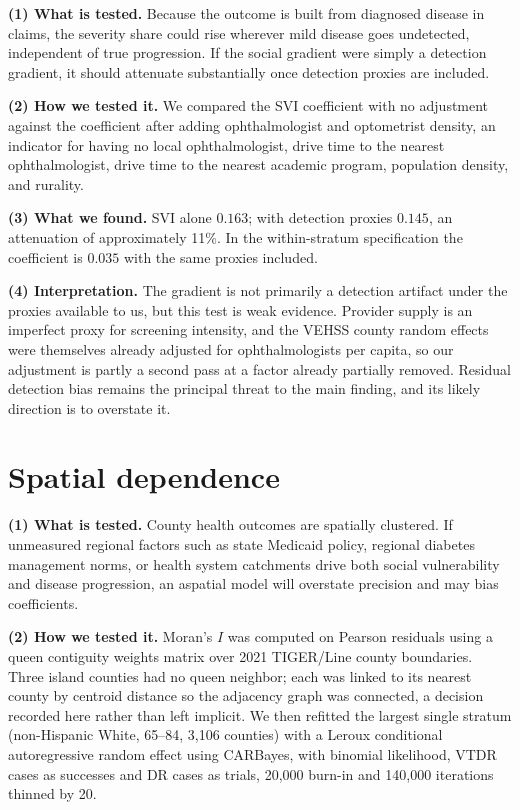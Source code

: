 \documentclass[11pt]{article}
\newcommand{\tpart}[1]{\medskip\noindent\textbf{#1}\quad}
\begin{document}
\tpart{(1) What is tested.}
Because the outcome is built from diagnosed disease in claims, the severity
share could rise wherever mild disease goes undetected, independent of true
progression. If the social gradient were simply a detection gradient, it should
attenuate substantially once detection proxies are included.

\tpart{(2) How we tested it.}
We compared the SVI coefficient with no adjustment against the coefficient after
adding ophthalmologist and optometrist density, an indicator for having no local
ophthalmologist, drive time to the nearest ophthalmologist, drive time to the
nearest academic program, population density, and rurality.

\tpart{(3) What we found.}
SVI alone $0.163$; with detection proxies $0.145$, an attenuation of
approximately 11\%. In the within-stratum specification the coefficient is
$0.035$ with the same proxies included.

\tpart{(4) Interpretation.}
The gradient is not primarily a detection artifact under the proxies available
to us, but this test is weak evidence. Provider supply is an imperfect proxy for
screening intensity, and the VEHSS county random effects were themselves already
adjusted for ophthalmologists per capita, so our adjustment is partly a second
pass at a factor already partially removed. Residual detection bias remains the
principal threat to the main finding, and its likely direction is to overstate
it.

\section{Spatial dependence}

\tpart{(1) What is tested.}
County health outcomes are spatially clustered. If unmeasured regional factors
such as state Medicaid policy, regional diabetes management norms, or health
system catchments drive both social vulnerability and disease progression, an
aspatial model will overstate precision and may bias coefficients.

\tpart{(2) How we tested it.}
Moran's $I$ was computed on Pearson residuals using a queen contiguity weights
matrix over 2021 TIGER/Line county boundaries. Three island counties had no
queen neighbor; each was linked to its nearest county by centroid distance so
the adjacency graph was connected, a decision recorded here rather than left
implicit. We then refitted the largest single stratum (non-Hispanic White,
65--84, 3,106 counties) with a Leroux conditional autoregressive random effect
using CARBayes, with binomial likelihood, VTDR cases as successes and DR cases
as trials, 20,000 burn-in and 140,000 iterations thinned by 20.
\end{document}

